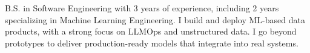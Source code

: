 

\begin{cvparagraph}

B.S. in Software Engineering with 3 years of experience, including 2 years specializing in Machine Learning Engineering. I build and deploy ML-based data products, with a strong focus on LLMOps and unstructured data. I go beyond prototypes to deliver production-ready models that integrate into real systems.
\end{cvparagraph}
